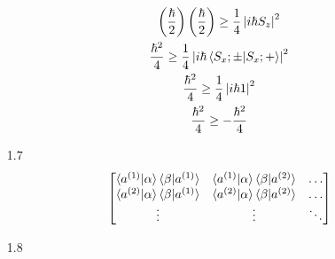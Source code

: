 \documentclass[12pt]{article}
\begin{document}
\begin{enumerate}
\begin{gather*}
            \left(\frac{\hbar}{2}\right)
            \left(\frac{\hbar}{2}\right)
            \geq\frac{1}{4}\left|i\hbar S_z\right|^2\\
            \frac{\hbar^2}{4}\geq\frac{1}{4}\left|i\hbar \braket{S_x ;\pm|S_x ;+}\right|^2\\
            \frac{\hbar^2}{4}\geq\frac{1}{4}\left|i\hbar1\right|^2\\
            \frac{\hbar^2}{4}\geq-\frac{\hbar^2}{4}
        \end{gather*}
        \item[1.7]
        \begin{gather*}
            \begin{bmatrix}
                \braket{a^{(1)}|\alpha}\braket{\beta|a^{(1)}} & \braket{a^{(1)}|\alpha}\braket{\beta|a^{(2)}} & \ldots\\
                \braket{a^{(2)}|\alpha}\braket{\beta|a^{(1)}} & \braket{a^{(2)}|\alpha}\braket{\beta|a^{(2)}} & \ldots\\
                \vdots                                        & \vdots                                        & \ddots
            \end{bmatrix}
        \end{gather*}
        \item[1.8]
    \end{enumerate}
\end{document}
